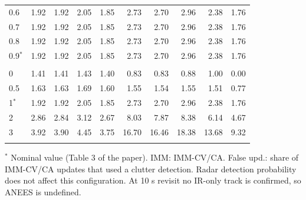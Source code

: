\begin{table}[!htbp]
\begin{tabular}{@{}lrrrrrrrrr@{}}
0.6 & 1.92 & 1.92 & 2.05 & 1.85 & 2.73 & 2.70 & 2.96 & 2.38 & 1.76 \\
0.7 & 1.92 & 1.92 & 2.05 & 1.85 & 2.73 & 2.70 & 2.96 & 2.38 & 1.76 \\
0.8 & 1.92 & 1.92 & 2.05 & 1.85 & 2.73 & 2.70 & 2.96 & 2.38 & 1.76 \\
0.9$^\ast$ & 1.92 & 1.92 & 2.05 & 1.85 & 2.73 & 2.70 & 2.96 & 2.38 & 1.76 \\
\addlinespace[2pt]
\multicolumn{11}{@{}l}{\textit{False alarms per scan}} \\
0 & 1.41 & 1.41 & 1.43 & 1.40 & 0.83 & 0.83 & 0.88 & 1.00 & 0.00 \\
0.5 & 1.63 & 1.63 & 1.69 & 1.60 & 1.55 & 1.54 & 1.55 & 1.51 & 0.77 \\
1$^\ast$ & 1.92 & 1.92 & 2.05 & 1.85 & 2.73 & 2.70 & 2.96 & 2.38 & 1.76 \\
2 & 2.86 & 2.84 & 3.12 & 2.67 & 8.03 & 7.87 & 8.38 & 6.14 & 4.67 \\
3 & 3.92 & 3.90 & 4.45 & 3.75 & 16.70 & 16.46 & 18.38 & 13.68 & 9.32 \\
\addlinespace[2pt]
\bottomrule
\end{tabular}

\smallskip
\parbox{\textwidth}{\footnotesize $^\ast$ Nominal value (Table 3 of the paper). IMM: IMM-CV/CA. False upd.: share of IMM-CV/CA updates that used a clutter detection. Radar detection probability does not affect this configuration. At 10 s revisit no IR-only track is confirmed, so ANEES is undefined.}
\end{table}

